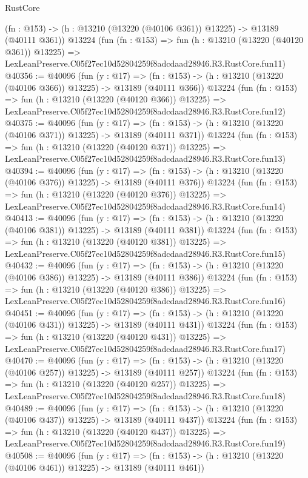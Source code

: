 \begin{lexlean}{RustCore}
\begin{coremodule}
    (fn : @153) -> (h : @13210 (@13220 (@40106 @361)) @13225) -> @13189 (@40111 @361))
    @13224
    (fun (fn : @153) =>
    fun (h : @13210 (@13220 (@40120 @361)) @13225) =>
    LexLeanPreserve.C05f27ec10d52804259f8adcdaad28946.R3.RustCore.fun11)
@40356 := @40096
    (fun (y : @17) =>
    (fn : @153) -> (h : @13210 (@13220 (@40106 @366)) @13225) -> @13189 (@40111 @366))
    @13224
    (fun (fn : @153) =>
    fun (h : @13210 (@13220 (@40120 @366)) @13225) =>
    LexLeanPreserve.C05f27ec10d52804259f8adcdaad28946.R3.RustCore.fun12)
@40375 := @40096
    (fun (y : @17) =>
    (fn : @153) -> (h : @13210 (@13220 (@40106 @371)) @13225) -> @13189 (@40111 @371))
    @13224
    (fun (fn : @153) =>
    fun (h : @13210 (@13220 (@40120 @371)) @13225) =>
    LexLeanPreserve.C05f27ec10d52804259f8adcdaad28946.R3.RustCore.fun13)
@40394 := @40096
    (fun (y : @17) =>
    (fn : @153) -> (h : @13210 (@13220 (@40106 @376)) @13225) -> @13189 (@40111 @376))
    @13224
    (fun (fn : @153) =>
    fun (h : @13210 (@13220 (@40120 @376)) @13225) =>
    LexLeanPreserve.C05f27ec10d52804259f8adcdaad28946.R3.RustCore.fun14)
@40413 := @40096
    (fun (y : @17) =>
    (fn : @153) -> (h : @13210 (@13220 (@40106 @381)) @13225) -> @13189 (@40111 @381))
    @13224
    (fun (fn : @153) =>
    fun (h : @13210 (@13220 (@40120 @381)) @13225) =>
    LexLeanPreserve.C05f27ec10d52804259f8adcdaad28946.R3.RustCore.fun15)
@40432 := @40096
    (fun (y : @17) =>
    (fn : @153) -> (h : @13210 (@13220 (@40106 @386)) @13225) -> @13189 (@40111 @386))
    @13224
    (fun (fn : @153) =>
    fun (h : @13210 (@13220 (@40120 @386)) @13225) =>
    LexLeanPreserve.C05f27ec10d52804259f8adcdaad28946.R3.RustCore.fun16)
@40451 := @40096
    (fun (y : @17) =>
    (fn : @153) -> (h : @13210 (@13220 (@40106 @431)) @13225) -> @13189 (@40111 @431))
    @13224
    (fun (fn : @153) =>
    fun (h : @13210 (@13220 (@40120 @431)) @13225) =>
    LexLeanPreserve.C05f27ec10d52804259f8adcdaad28946.R3.RustCore.fun17)
@40470 := @40096
    (fun (y : @17) =>
    (fn : @153) -> (h : @13210 (@13220 (@40106 @257)) @13225) -> @13189 (@40111 @257))
    @13224
    (fun (fn : @153) =>
    fun (h : @13210 (@13220 (@40120 @257)) @13225) =>
    LexLeanPreserve.C05f27ec10d52804259f8adcdaad28946.R3.RustCore.fun18)
@40489 := @40096
    (fun (y : @17) =>
    (fn : @153) -> (h : @13210 (@13220 (@40106 @437)) @13225) -> @13189 (@40111 @437))
    @13224
    (fun (fn : @153) =>
    fun (h : @13210 (@13220 (@40120 @437)) @13225) =>
    LexLeanPreserve.C05f27ec10d52804259f8adcdaad28946.R3.RustCore.fun19)
@40508 := @40096
    (fun (y : @17) =>
    (fn : @153) -> (h : @13210 (@13220 (@40106 @461)) @13225) -> @13189 (@40111 @461))

\end{coremodule}
\end{lexlean}
